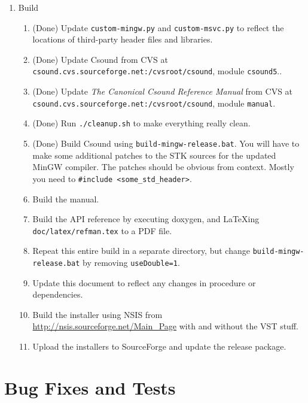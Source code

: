 \documentclass[11pt,letterpaper,onecolumn]{scrartcl}
\begin{document}
\begin{sloppypar}
\begin{enumerate}
\begin{enumerate}
		\end{enumerate}
	\item Build   
		\begin{enumerate}
    	\item (Done) Update \texttt{custom-mingw.py} and \texttt{custom-msvc.py} to reflect the locations of third-party header files and libraries.
			\item (Done) Update Csound from CVS at \verb|csound.cvs.sourceforge.net:/cvsroot/csound|, module \texttt{csound5}..
			\item (Done) Update \emph{The Canonical Csound Reference Manual} from CVS at \verb|csound.cvs.sourceforge.net:/cvsroot/csound|, module \texttt{manual}.
			\item (Done) Run \texttt{./cleanup.sh} to make everything really clean.
	    \item (Done) Build Csound using \texttt{build-mingw-release.bat}. You will have to make some additional patches to the STK sources for the updated MinGW compiler. The patches should be obvious from context. Mostly you need to \verb|#include <some_std_header>|.
	    \item Build the manual.
	    \item Build the API reference by executing doxygen, and LaTeXing \texttt{doc/latex/refman.tex} to a PDF file.
	    \item Repeat this entire build in a separate directory, but change \texttt{build-mingw-release.bat} by removing \verb|useDouble=1|. 
	    \item Update this document to reflect any changes in procedure or dependencies. 
	    \item Build the installer using NSIS from \url{http://nsis.sourceforge.net/Main_Page} with and without the VST stuff.   
	    \item Upload the installers to SourceForge and update the release package.
		\end{enumerate}
 \end{enumerate}

\section{Bug Fixes and Tests}
\label{sec:BugFixesAndTests}


\end{sloppypar}
\end{document}
